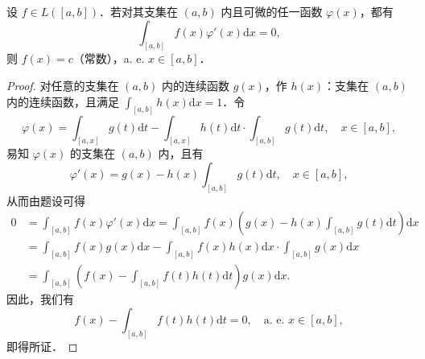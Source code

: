 \documentclass[../../main.tex]{subfiles}
\begin{document}
\begin{example}
设 \( f \in L([a,b]) \)．若对其支集在 \( (a,b) \) 内且可微的任一函数 \( \varphi(x) \)，都有
\[
\int_{[a,b]} f(x)\varphi'(x) \mathrm{d}x = 0,
\]
则 \( f(x) = c \)（常数），a. e. \( x \in [a,b] \)．
\end{example}
\begin{proof}
对任意的支集在 \( (a,b) \) 内的连续函数 \( g(x) \)，作 \( h(x) \)：支集在 \( (a,b) \) 内的连续函数，且满足 \( \int_{[a,b]} h(x) \mathrm{d}x = 1 \)．令
\[
\varphi(x) = \int_{[a,x]} g(t) \mathrm{d}t - \int_{[a,x]} h(t) \mathrm{d}t \cdot \int_{[a,b]} g(t) \mathrm{d}t, \quad x \in [a,b],
\]
易知 \( \varphi(x) \) 的支集在 \( (a,b) \) 内，且有
\[
\varphi'(x) = g(x) - h(x)\int_{[a,b]} g(t) \mathrm{d}t, \quad x \in [a,b],
\]
从而由题设可得
\begin{align*}
0 &= \int_{[a,b]} f(x)\varphi'(x) \mathrm{d}x = \int_{[a,b]} f(x)\left( g(x) - h(x)\int_{[a,b]} g(t) \mathrm{d}t \right) \mathrm{d}x \\
&= \int_{[a,b]} f(x)g(x) \mathrm{d}x - \int_{[a,b]} f(x)h(x) \mathrm{d}x \cdot \int_{[a,b]} g(x) \mathrm{d}x \\
&= \int_{[a,b]} \left( f(x) - \int_{[a,b]} f(t)h(t) \mathrm{d}t \right) g(x) \mathrm{d}x.
\end{align*}
因此，我们有
\[
f(x) - \int_{[a,b]} f(t)h(t) \mathrm{d}t = 0, \quad \text{a. e. } x \in [a,b],
\]
即得所证．
\end{proof}
\end{document}
